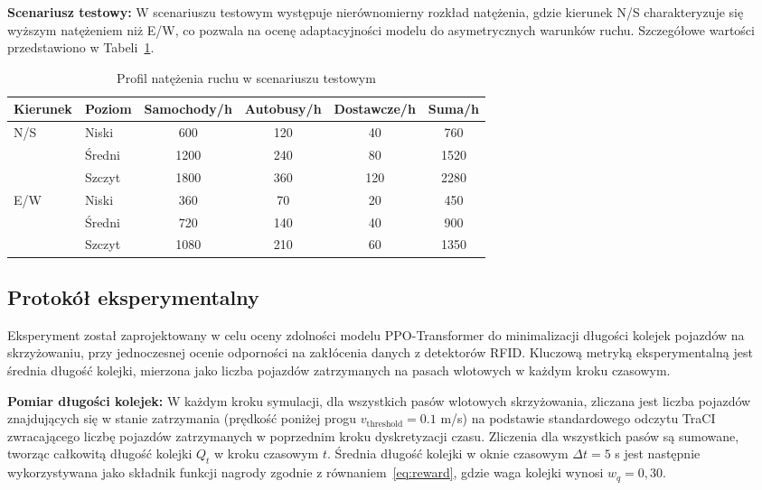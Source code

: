 \documentclass[10pt,a4paper]{article}
\begin{document}
\textbf{Scenariusz testowy:} W scenariuszu testowym występuje nierównomierny rozkład natężenia, gdzie kierunek N/S charakteryzuje się wyższym natężeniem niż E/W, co pozwala na ocenę adaptacyjności modelu do asymetrycznych warunków ruchu. Szczegółowe wartości przedstawiono w Tabeli~\ref{tab:3}.

\begin{table}[H]
\centering
\caption{Profil natężenia ruchu w scenariuszu testowym}
\label{tab:3}
\begin{tabular}{llcccc}
\toprule
Kierunek & Poziom & Samochody/h & Autobusy/h & Dostawcze/h & Suma/h \\
\midrule
\multirow{3}{*}{N/S} & Niski & 600 & 120 & 40 & 760 \\
 & Średni & 1200 & 240 & 80 & 1520 \\
 & Szczyt & 1800 & 360 & 120 & 2280 \\
\midrule
\multirow{3}{*}{E/W} & Niski & 360 & 70 & 20 & 450 \\
 & Średni & 720 & 140 & 40 & 900 \\
 & Szczyt & 1080 & 210 & 60 & 1350 \\
\bottomrule
\end{tabular}
\end{table}

\subsection{Protokół eksperymentalny}

Eksperyment został zaprojektowany w celu oceny zdolności modelu PPO-Transformer do minimalizacji długości kolejek pojazdów na skrzyżowaniu, przy jednoczesnej ocenie odporności na zakłócenia danych z detektorów RFID. Kluczową metryką eksperymentalną jest średnia długość kolejki, mierzona jako liczba pojazdów zatrzymanych na pasach wlotowych w każdym kroku czasowym.

\textbf{Pomiar długości kolejek:} W każdym kroku symulacji, dla wszystkich pasów wlotowych skrzyżowania, zliczana jest liczba pojazdów znajdujących się w stanie zatrzymania (prędkość poniżej progu $v_{\text{threshold}} = 0.1$ m/s) na podstawie standardowego odczytu TraCI zwracającego liczbę pojazdów zatrzymanych w poprzednim kroku dyskretyzacji czasu. Zliczenia dla wszystkich pasów są sumowane, tworząc całkowitą długość kolejki $Q_t$ w kroku czasowym $t$. Średnia długość kolejki w oknie czasowym $\Delta t = 5$ s jest następnie wykorzystywana jako składnik funkcji nagrody zgodnie z równaniem~\eqref{eq:reward}, gdzie waga kolejki wynosi $w_q = 0{,}30$.
\end{document}

